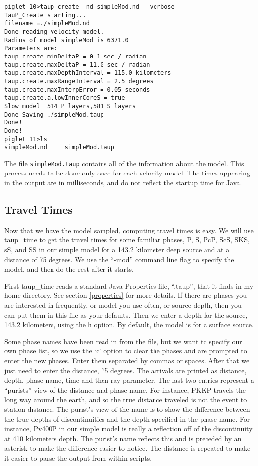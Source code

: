\begin{verbatim}
piglet 10>taup_create -nd simpleMod.nd --verbose
TauP_Create starting...
filename =./simpleMod.nd
Done reading velocity model.
Radius of model simpleMod is 6371.0
Parameters are:
taup.create.minDeltaP = 0.1 sec / radian
taup.create.maxDeltaP = 11.0 sec / radian
taup.create.maxDepthInterval = 115.0 kilometers
taup.create.maxRangeInterval = 2.5 degrees
taup.create.maxInterpError = 0.05 seconds
taup.create.allowInnerCoreS = true
Slow model  514 P layers,581 S layers
Done Saving ./simpleMod.taup
Done!
Done!
piglet 11>ls
simpleMod.nd     simpleMod.taup
\end{verbatim}

The file \texttt{simpleMod.taup} contains all of the information about the
model. This process needs to be done only once for each velocity model.
The times appearing in the output are in milliseconds, and do not reflect the
startup time for Java.

\subsection{Travel Times}

Now that we have the model sampled, computing travel times is easy.
We will use taup\_time to get the travel times for some familiar phases,
P, S, PcP, ScS, SKS, sS, and SS
in our simple model for a 143.2 kilometer deep
source and at a distance of 75 degrees. We use the ``-mod'' command line
flag to specify the model, and then do the rest after it starts.

First taup\_time reads a standard Java Properties file, ``.taup'',
that it finds in my home directory. See section \ref{properties} for
more details.
If there are phases you are interested in frequently, or model you use often,
or source depth, then you can put them in this file as your defaults.
Then we enter a depth for the source, 143.2 kilometers, using the \texttt{h}
option. By default, the model is for a surface source.

Some phase names have been read in from the file, but
we want to specify our own phase list, so we use the `c' option
to clear the phases and are prompted to enter the new phases. Enter them
separated by commas or spaces. After that we just need to enter the distance,
75 degrees. The arrivals are printed as distance, depth, phase name, time and then
ray parameter.
The last two entries represent a ``purists'' view of the distance and phase name. For instance, PKKP travels the long way around the earth, and so the
true distance traveled is not the event to station distance. The purist's
view of the name is to show the difference between the true depths of discontinuities and the depth specified in the phase name. For instance,
Pv400P in our simple model is really a reflection off of the discontinuity
at 410 kilometers depth. The purist's name reflects this and is preceded
by an asterisk to make the difference easier to notice.
The distance is repeated to make it easier to parse the output
from within scripts.

